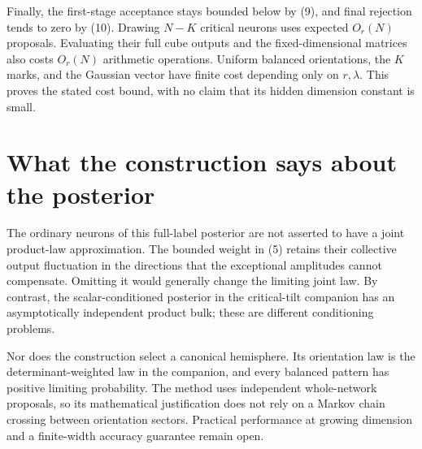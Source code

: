 \documentclass[11pt]{article}
\begin{document}
Finally, the first-stage acceptance stays bounded below by (9), and
final rejection tends to zero by (10). Drawing $N-K$ critical neurons
uses expected $O_r(N)$ proposals. Evaluating their full cube outputs and
the fixed-dimensional matrices also costs $O_r(N)$ arithmetic operations.
Uniform balanced orientations, the $K$ marks, and the Gaussian vector
have finite cost depending only on $r,\lambda$. This proves the stated
cost bound, with no claim that its hidden dimension constant is small.

\section{What the construction says about the posterior}
The ordinary neurons of this full-label posterior are not asserted to
have a joint product-law approximation. The bounded weight in (5)
retains their collective output fluctuation in the directions that the
exceptional amplitudes cannot compensate. Omitting it would generally
change the limiting joint law. By contrast, the scalar-conditioned
posterior in the critical-tilt companion has an asymptotically independent
product bulk; these are different conditioning problems.

Nor does the construction select a canonical hemisphere. Its orientation
law is the determinant-weighted law in the companion, and every balanced
pattern has positive limiting probability. The method uses independent
whole-network proposals, so its mathematical justification does not rely
on a Markov chain crossing between orientation sectors. Practical
performance at growing dimension and a finite-width accuracy guarantee
remain open.

\end{document}
